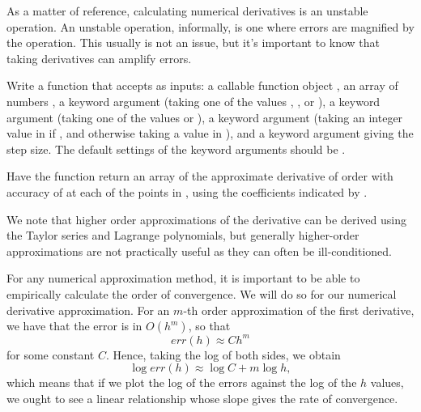 As a matter of reference, calculating numerical derivatives is an unstable operation. An unstable operation, informally, is one where errors are magnified by the operation. This usually is not an issue, but it's important to know that taking derivatives can amplify errors.

\begin{problem}
Write a function  that accepts as inputs: a callable function object , an
array of numbers , a keyword argument  (taking one of the values 
, , or ), a keyword argument  (taking one of 
the values  or ), a keyword argument  (taking an integer value in 
\li{[2, 4, 6]} if , and otherwise taking a value in \li{[1, 2, 3]}), and
a keyword argument  giving the step size. The default settings of the keyword
arguments should be .
 
Have the function return an array of the approximate derivative of order  with accuracy
  of  at each of the points in , using the coefficients indicated by .
\end{problem}

We note that higher order approximations of the derivative can be derived using the Taylor series and Lagrange polynomials, but generally higher-order approximations are not practically useful as they can often be ill-conditioned.

For any numerical approximation method, it is important to be able to empirically calculate
the order of convergence. We will do so for our numerical derivative approximation. 
For an $m$-th order approximation of the first derivative, we have that the error is in
$O(h^m)$, so that
$$
err(h) \approx Ch^m
$$
for some constant $C$.
Hence, taking the log of both sides, we obtain
$$
\log err(h) \approx \log C + m\log h,
$$
which means that if we plot the log of the errors against the log of the $h$ values, we 
ought to see a linear relationship whose slope gives the rate of convergence. 

